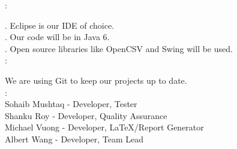 \documentclass[a4paper]{article}
\begin{document}
:

\indent{}. Eclipse is our IDE of choice. \\
\indent{}. Our code will be in Java 6. \\
\indent{}. Open source libraries like OpenCSV and Swing will be used. \\

:

We are using Git to keep our projects up to date. \\

: \\
\indent\indent Sohaib Mushtaq - Developer, Tester \\
\indent\indent Shanku Roy - Developer, Quality Assurance \\
\indent\indent Michael Vuong - Developer, LaTeX/Report Generator \\
\indent\indent Albert Wang -  Developer, Team Lead \\
\end{document}
